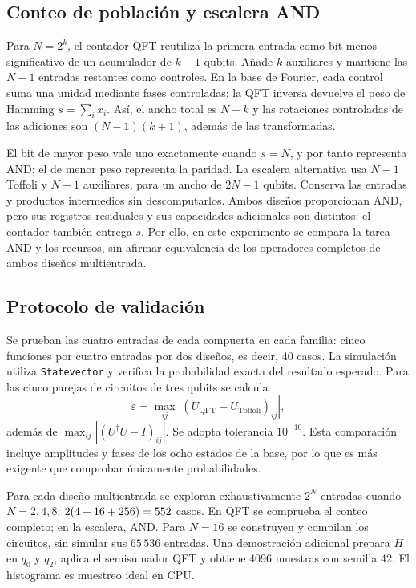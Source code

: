 \subsection{Conteo de población y escalera AND}
Para $N=2^k$, el contador QFT reutiliza la primera entrada como bit menos
significativo de un acumulador de $k+1$ qubits. Añade $k$ auxiliares y mantiene
las $N-1$ entradas restantes como controles. En la base de Fourier, cada
control suma una unidad mediante fases controladas; la QFT inversa devuelve
el peso de Hamming $s=\sum_i x_i$.
Así, el ancho total es $N+k$ y las rotaciones controladas de las adiciones
son $(N-1)(k+1)$, además de las transformadas.

El bit de mayor peso vale uno exactamente cuando $s=N$, y por tanto representa
AND; el de menor peso representa la paridad. La escalera alternativa usa
$N-1$ Toffoli y $N-1$ auxiliares, para un ancho de $2N-1$ qubits. Conserva
las entradas y productos intermedios sin descomputarlos. Ambos diseños
proporcionan AND, pero sus registros residuales y sus capacidades adicionales
son distintos: el contador también entrega $s$. Por ello, en este experimento
se compara la tarea AND y los recursos, sin afirmar equivalencia de los
operadores completos de ambos diseños multientrada.

\subsection{Protocolo de validación}
Se prueban las cuatro entradas de cada compuerta en cada familia: cinco
funciones por cuatro entradas por dos diseños, es decir, 40 casos.
La simulación utiliza \texttt{Statevector} \cite{statedocs} y verifica la
probabilidad exacta del resultado esperado. Para las cinco parejas de
circuitos de tres qubits se calcula
\begin{equation}
\varepsilon=\max_{ij}|(U_{\mathrm{QFT}}-U_{\mathrm{Toffoli}})_{ij}|,
\end{equation}
además de $\max_{ij}|(U^\dagger U-I)_{ij}|$. Se adopta tolerancia $10^{-10}$.
Esta comparación incluye amplitudes y fases de los ocho estados de la base,
por lo que es más exigente que comprobar únicamente probabilidades.

Para cada diseño multientrada se exploran exhaustivamente $2^N$ entradas
cuando $N=2,4,8$: $2(4+16+256)=552{}$ casos.
En QFT se comprueba el conteo completo; en la escalera, AND.
Para $N=16$ se construyen y compilan los circuitos, sin simular sus
$65\,536$ entradas. Una demostración adicional prepara $H$ en $q_0$ y $q_2$,
aplica el semisumador QFT y obtiene 4096 muestras con semilla 42.
El histograma es muestreo ideal en CPU.

